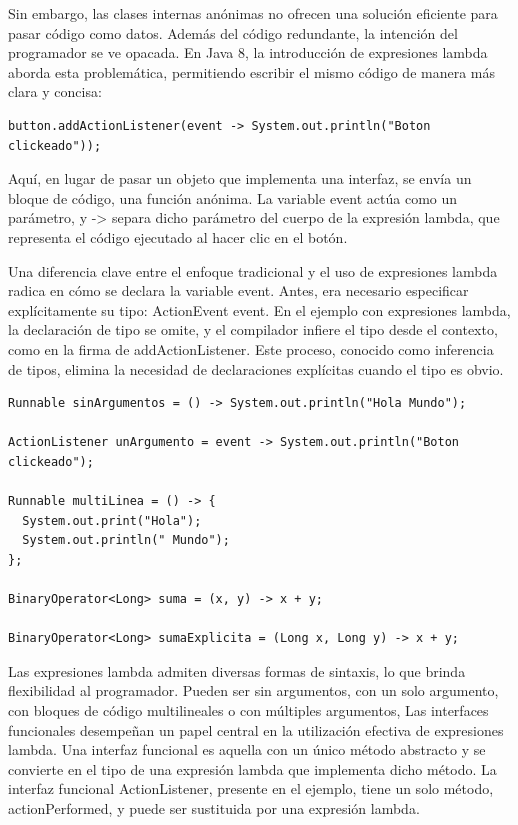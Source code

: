 \documentclass[12pt]{article}
\begin{document}
\begin{enumerate}
    Sin embargo, las clases internas anónimas no ofrecen una solución eficiente para pasar código como datos. Además del código redundante, la intención del programador se ve opacada. En Java 8, la introducción de expresiones lambda aborda esta problemática, permitiendo escribir el mismo código de manera más clara y concisa:

    \begin{lstlisting}[basicstyle={\normalsize\ttfamily}]
button.addActionListener(event -> System.out.println("Boton clickeado"));
    \end{lstlisting}

    Aquí, en lugar de pasar un objeto que implementa una interfaz, se envía un bloque de código, una función anónima. La variable event actúa como un parámetro, y -> separa dicho parámetro del cuerpo de la expresión lambda, que representa el código ejecutado al hacer clic en el botón.

    Una diferencia clave entre el enfoque tradicional y el uso de expresiones lambda radica en cómo se declara la variable event. Antes, era necesario especificar explícitamente su tipo: ActionEvent event. En el ejemplo con expresiones lambda, la declaración de tipo se omite, y el compilador infiere el tipo desde el contexto, como en la firma de addActionListener. Este proceso, conocido como inferencia de tipos, elimina la necesidad de declaraciones explícitas cuando el tipo es obvio.

    \begin{lstlisting}[basicstyle={\normalsize\ttfamily}]
Runnable sinArgumentos = () -> System.out.println("Hola Mundo");

ActionListener unArgumento = event -> System.out.println("Boton clickeado");

Runnable multiLinea = () -> {
  System.out.print("Hola");
  System.out.println(" Mundo");
};

BinaryOperator<Long> suma = (x, y) -> x + y;

BinaryOperator<Long> sumaExplicita = (Long x, Long y) -> x + y;
    \end{lstlisting}

    Las expresiones lambda admiten diversas formas de sintaxis, lo que brinda flexibilidad al programador. Pueden ser sin argumentos, con un solo argumento, con bloques de código multilineales o con múltiples argumentos, Las interfaces funcionales desempeñan un papel central en la utilización efectiva de expresiones lambda. Una interfaz funcional es aquella con un único método abstracto y se convierte en el tipo de una expresión lambda que implementa dicho método. La interfaz funcional ActionListener, presente en el ejemplo, tiene un solo método, actionPerformed, y puede ser sustituida por una expresión lambda.


\end{enumerate}
\end{document}
